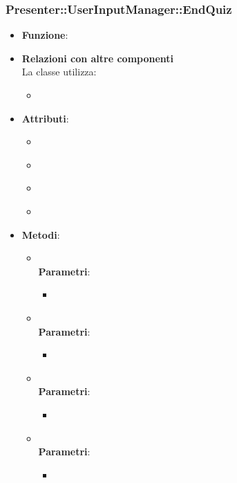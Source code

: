 \subsubsection{Presenter::UserInputManager::EndQuiz}
\begin{itemize}
\item\textbf{Funzione}:
\item\textbf{Relazioni con altre componenti}\\
La classe utilizza:
	\begin{itemize}
		\item
	\end{itemize}
\item\textbf{Attributi}:
	\begin{itemize}
		\item\code{}\\
		\item\code{}\\
		\item\code{}\\
		\item\code{}\\
	\end{itemize}
\item\textbf{Metodi}:
	\begin{itemize}
		\item\code{}\\
		\textbf{Parametri}:
			\begin{itemize}
				\item\code{}\\
			\end{itemize}
		\item\code{}\\
		\textbf{Parametri}:
			\begin{itemize}
				\item\code{}\\
			\end{itemize}
		\item\code{}\\
		\textbf{Parametri}:
			\begin{itemize}
				\item\code{}\\
			\end{itemize}
		\item\code{}\\
		\textbf{Parametri}:
			\begin{itemize}
				\item\code{}\\
			\end{itemize}
	\end{itemize}
\end{itemize}

